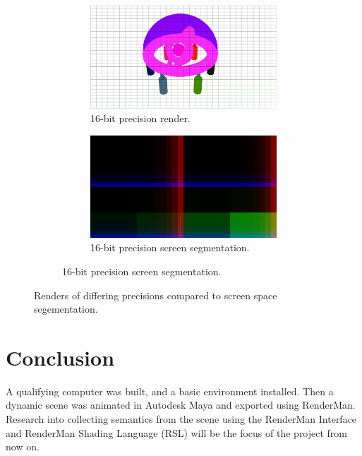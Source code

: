 \documentclass[conference]{IEEEtran}
\begin{document}
\begin{figure}[htbp]
\begin{subfigure}{1.1\textwidth}
\begin{center}
\begin{minipage}[t]{\linewidth}
\hspace{-0.09\linewidth}
  \centering
    \begin{subfigure}{.49\textwidth}
      \centering
      \includegraphics[width=\linewidth]{16_render_cropped.jpg}
      \caption{16-bit precision render.}
      \label{fig:render_8}
    \end{subfigure}
    \begin{subfigure}{.49\textwidth}
      \centering
      \includegraphics[width=\linewidth]{16_partition_cropped.jpg}
      \caption{16-bit precision screen segmentation.}
      \label{fig:render_8}
    \end{subfigure}
  \label{fig:render_16}
\end{minipage}
\end{center}
\end{subfigure}
\caption{Renders of differing precisions compared to screen space segementation.}
\label{fig:render_comparisons}
\end{figure}

\section{Conclusion}
\label{sec:conclusion}
A qualifying computer was built, and a basic environment installed.
Then a dynamic scene was animated in Autodesk Maya and exported
using RenderMan. Research into collecting semantics from the scene using
the RenderMan Interface and RenderMan Shading Language (RSL)
will be the focus of the project from now on.
\end{document}
